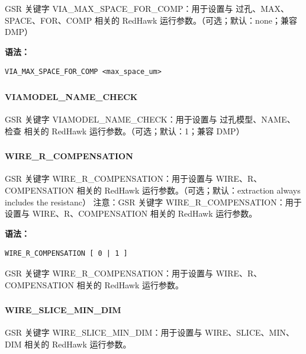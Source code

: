 GSR 关键字 VIA_MAX_SPACE_FOR_COMP：用于设置与 过孔、MAX、SPACE、FOR、COMP 相关的 RedHawk 运行参数。（可选；默认：none；兼容 DMP）

\textbf{语法：}
\begin{lstlisting}
VIA_MAX_SPACE_FOR_COMP <max_space_um>
\end{lstlisting}

\subsubsection{}
\paragraph*{VIAMODEL_NAME_CHECK}

GSR 关键字 VIAMODEL_NAME_CHECK：用于设置与 过孔模型、NAME、检查 相关的 RedHawk 运行参数。（可选；默认：1；兼容 DMP）

\subsubsection{}
\paragraph*{WIRE_R_COMPENSATION}

GSR 关键字 WIRE_R_COMPENSATION：用于设置与 WIRE、R、COMPENSATION 相关的 RedHawk 运行参数。（可选；默认：extraction always includes the resistanc） 注意：GSR 关键字 WIRE_R_COMPENSATION：用于设置与 WIRE、R、COMPENSATION 相关的 RedHawk 运行参数。

\textbf{语法：}
\begin{lstlisting}
WIRE_R_COMPENSATION [ 0 | 1 ]
\end{lstlisting}

\begin{noteBox}
GSR 关键字 WIRE\_R\_COMPENSATION：用于设置与 WIRE、R、COMPENSATION 相关的 RedHawk 运行参数。
\end{noteBox}

\subsubsection{}
\paragraph*{WIRE_SLICE_MIN_DIM}

GSR 关键字 WIRE_SLICE_MIN_DIM：用于设置与 WIRE、SLICE、MIN、DIM 相关的 RedHawk 运行参数。

